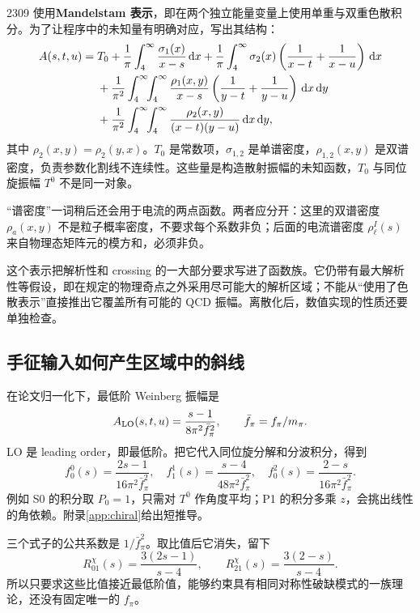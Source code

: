 \documentclass[UTF8,a4paper,11pt,fontset=fandol]{ctexart}
\numberwithin{equation}{section}
\newcommand{\dd}{\,\mathrm d}
\begin{document}
2309 使用\textbf{Mandelstam 表示}，即在两个独立能量变量上使用单重与双重色散积分。为了让程序中的未知量有明确对应，写出其结构：
\begin{align}\label{eq:mandelstam}
A(s,t,u)={}&T_0+\frac1\pi\int_4^\infty\frac{\sigma_1(x)}{x-s}\dd x
+\frac1\pi\int_4^\infty\sigma_2(x)\left(\frac1{x-t}+\frac1{x-u}\right)\dd x\notag\\
&+\frac1{\pi^2}\int_4^\infty\!\!\int_4^\infty
\frac{\rho_1(x,y)}{x-s}\left(\frac1{y-t}+\frac1{y-u}\right)\dd x\dd y\notag\\
&+\frac1{\pi^2}\int_4^\infty\!\!\int_4^\infty
\frac{\rho_2(x,y)}{(x-t)(y-u)}\dd x\dd y,
\end{align}
其中 \(\rho_2(x,y)=\rho_2(y,x)\)。\(T_0\) 是常数项，\(\sigma_{1,2}\) 是单谱密度，\(\rho_{1,2}(x,y)\) 是双谱密度，负责参数化割线不连续性。这些量是构造散射振幅的未知函数，\(T_0\) 与同位旋振幅 \(T^0\) 不是同一对象。

“谱密度”一词稍后还会用于电流的两点函数。两者应分开：这里的双谱密度 \(\rho_a(x,y)\) 不是粒子概率密度，不要求每个系数非负；后面的电流谱密度 \(\rho_\ell^I(s)\) 来自物理态矩阵元的模方和，必须非负。

这个表示把解析性和 crossing 的一大部分要求写进了函数族。它仍带有最大解析性等假设，即在规定的物理奇点之外采用尽可能大的解析区域；不能从“使用了色散表示”直接推出它覆盖所有可能的 QCD 振幅。离散化后，数值实现的性质还要单独检查。

\subsection{手征输入如何产生区域中的斜线}
在论文归一化下，最低阶 Weinberg 振幅是
\begin{equation}
A_{\rm LO}(s,t,u)=\frac{s-1}{8\pi^2\bar f_\pi^2},\qquad
\bar f_\pi=f_\pi/m_\pi.
\end{equation}
LO 是 leading order，即最低阶。把它代入同位旋分解和分波积分，得到
\begin{equation}\label{eq:LOwaves}
f_0^0(s)=\frac{2s-1}{16\pi^2\bar f_\pi^2},\quad
f_1^1(s)=\frac{s-4}{48\pi^2\bar f_\pi^2},\quad
f_0^2(s)=\frac{2-s}{16\pi^2\bar f_\pi^2}.
\end{equation}
例如 S0 的积分取 \(P_0=1\)，只需对 \(T^0\) 作角度平均；P1 的积分多乘 \(z\)，会挑出线性的角依赖。附录\ref{app:chiral}给出短推导。

三个式子的公共系数是 \(1/\bar f_\pi^2\)。取比值后它消失，留下
\begin{equation}\label{eq:ratios}
R_{01}^{\chi}(s)=\frac{3(2s-1)}{s-4},\qquad
R_{21}^{\chi}(s)=\frac{3(2-s)}{s-4}.
\end{equation}
所以只要求这些比值接近最低阶值，能够约束具有相同对称性破缺模式的一族理论，还没有固定唯一的 \(f_\pi\)。
\end{document}
